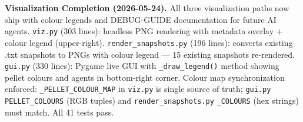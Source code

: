 \documentclass[11pt,a4paper]{article}
\begin{document}
\textbf{Visualization Completion (2026-05-24).} All three visualization paths now ship with colour legends and DEBUG-GUIDE documentation for future AI agents. \texttt{viz.py} (303 lines): headless PNG rendering with metadata overlay + colour legend (upper-right). \texttt{render\_snapshots.py} (196 lines): converts existing .txt snapshots to PNGs with colour legend — 15 existing snapshots re-rendered. \texttt{gui.py} (330 lines): Pygame live GUI with \texttt{\_draw\_legend()} method showing pellet colours and agents in bottom-right corner. Colour map synchronization enforced: \texttt{\_PELLET\_COLOUR\_MAP} in \texttt{viz.py} is single source of truth; \texttt{gui.py} \texttt{PELLET\_COLOURS} (RGB tuples) and \texttt{render\_snapshots.py} \texttt{\_COLOURS} (hex strings) must match. All 41 tests pass.



\end{document}
